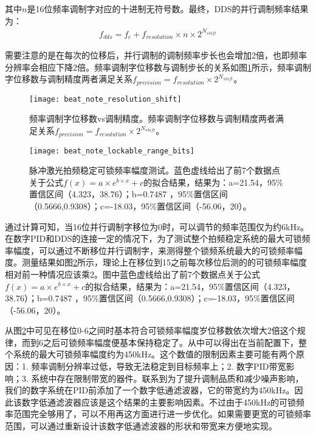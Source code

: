 其中$n$是16位频率调制字对应的十进制无符号数。最终，DDS的并行调制频率结果为：
\begin{align}
    f_{dds}=f_c+f_{resolution}\times n \times 2^{N_{shift}}
\end{align}

需要注意的是在每次的位移后，并行调制的调制频率步长也会增加2倍，也即频率分辨率会相应下降2倍。频率调制字位移数与调制步长的关系如图\ref{fig:beat_note_resolution_shift}所示，频率调制字位移数与调制精度两者满足关系$f_{precision}=f_{resolution}\times2^{N_{shift}}$。

\begin{figure}
    \centering
    \caption[频率调制字位移数vs调制精度
    ]{频率调制字位移数vs调制精度。频率调制字位移数与调制精度两者满足关系$f_{precision}=f_{resolution}\times2^{N_{shift}}$。
    \label{fig:beat_note_resolution_shift}}
    \texttt{[image: beat\_note\_resolution\_shift]}
\end{figure}


\begin{figure}
    \centering
    \caption[脉冲激光拍频稳定可锁频率幅度测试]{脉冲激光拍频稳定可锁频率幅度测试。蓝色虚线给出了前7个数据点关于公式$f(x)=a\times e^{b\times x}+c$的拟合结果，结果为：a=21.54，95\%置信区间（4.323，38.76）；b=0.7487 ，95\%置信区间（0.5666,0.9308）；c=-18.03，95\%置信区间（-56.06，20）。\label{fig:beat_note_lockable_range_bits}}
    \texttt{[image: beat\_note\_lockable\_range\_bits]}
\end{figure}

通过计算可知，当16位并行调制字移位为0时，可以调节的频率范围仅为约6kHz。在数字PID和DDS的连接一定的情况下，为了测试整个拍频稳定系统的最大可锁频率幅度，可以通过不断移位并行调制字，来测得整个锁频系统最大的可锁频率幅度。测量结果如图\ref{fig:beat_note_lockable_range_bits}所示，理论上在移位到15之前每次移位后测的的可锁频率幅度相对前一种情况应该乘2。图中蓝色虚线给出了前7个数据点关于公式$f(x)=a\times e^{b\times x}+c$的拟合结果，结果为：a=21.54，95\%置信区间（4.323，38.76）；b=0.7487 ，95\%置信区间（0.5666,0.9308）；c=-18.03，95\%置信区间（-56.06，20）。

从图\ref{fig:beat_note_lockable_range_bits}中可见在移位0-6之间时基本符合可锁频率幅度岁位移数依次增大2倍这个规律，而到6之后可锁频率幅度便基本保持稳定了。从中可以得出在当前配置下，整个系统的最大可锁频率幅度约为450kHz。这个数值的限制因素主要可能有两个原因：1. 频率调制分辨率过低，导致无法稳定到目标频率上；2. 数字PID带宽影响；3. 系统中存在限制带宽的器件。联系到为了提升调制品质和减少噪声影响，我们的数字系统在PID前添加了一个数字低通滤波器，它的带宽约为450kHz。因此该数字低通滤波器应该是这个结果的主要影响因素。不过由于450kHz的可锁频率范围完全够用了，可以不用再这方面进行进一步优化。如果需要更宽的可锁频率范围，可以通过重新设计该数字低通滤波器的形状和带宽来方便地实现。






